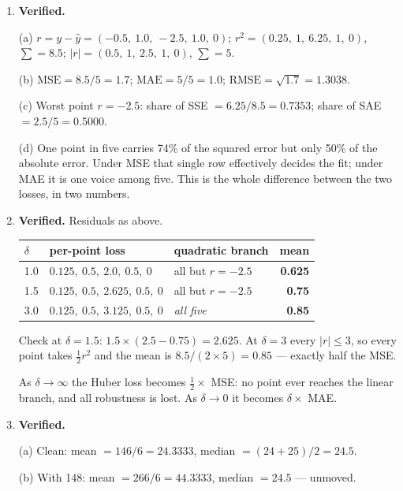 \documentclass[11pt,a4paper]{article}
\newcommand{\A}[1]{\item[\textbf{#1}]}
\begin{document}
\begin{enumerate}[leftmargin=1.9cm]

\A{U2.18} \textbf{Verified.}
\begin{answerbox}
(a) $r = y - \hat y = (-0.5,\ 1.0,\ -2.5,\ 1.0,\ 0)$;
$r^2 = (0.25,\ 1,\ 6.25,\ 1,\ 0)$, $\sum = 8.5$;
$|r| = (0.5,\ 1,\ 2.5,\ 1,\ 0)$, $\sum = 5$.

(b) $\text{MSE} = 8.5/5 = \mathbf{1.7}$; $\text{MAE} = 5/5 = \mathbf{1.0}$;
$\text{RMSE} = \sqrt{1.7} = \mathbf{1.3038}$.

(c) Worst point $r = -2.5$: share of SSE $= 6.25/8.5 = \mathbf{0.7353}$;
share of SAE $= 2.5/5 = \mathbf{0.5000}$.

(d) One point in five carries 74\% of the squared error but only 50\% of the
absolute error. Under MSE that single row effectively decides the fit; under
MAE it is one voice among five. This is the whole difference between the two
losses, in two numbers.
\end{answerbox}

\A{U2.19} \textbf{Verified.} Residuals as above.
\begin{answerbox}
\begin{center}\begin{tabular}{@{}lllr@{}}\toprule
$\delta$ & per-point loss & quadratic branch & mean\\
\midrule
1.0 & $0.125,\ 0.5,\ 2.0,\ 0.5,\ 0$ & all but $r=-2.5$ & \textbf{0.625}\\
1.5 & $0.125,\ 0.5,\ 2.625,\ 0.5,\ 0$ & all but $r=-2.5$ & \textbf{0.75}\\
3.0 & $0.125,\ 0.5,\ 3.125,\ 0.5,\ 0$ & \emph{all five} & \textbf{0.85}\\
\bottomrule\end{tabular}\end{center}
Check at $\delta = 1.5$: $1.5 \times (2.5 - 0.75) = 2.625$.
At $\delta = 3$ every $|r| \le 3$, so every point takes $\tfrac12 r^2$ and the
mean is $8.5/(2\times5) = 0.85$ --- exactly half the MSE.

As $\delta \to \infty$ the Huber loss becomes $\tfrac12 \times$ MSE: no point
ever reaches the linear branch, and all robustness is lost. As $\delta \to 0$
it becomes $\delta \times$ MAE.
\end{answerbox}

\A{U2.20} \textbf{Verified.}
\begin{answerbox}
(a) Clean: mean $= 146/6 = \mathbf{24.3333}$, median $= (24+25)/2 =
\mathbf{24.5}$.

(b) With 148: mean $= 266/6 = \mathbf{44.3333}$, median $= \mathbf{24.5}$
--- unmoved.


\end{answerbox}
\end{enumerate}
\end{document}
